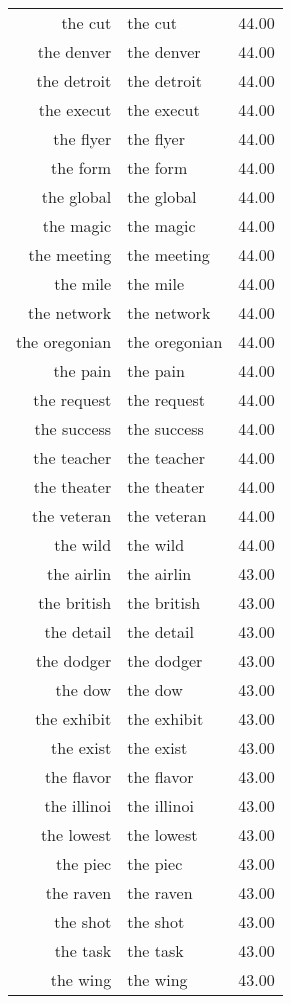 \begin{table}[ht]
\begin{tabular}{rlr}
  the cut & the cut & 44.00 \\ 
  the denver & the denver & 44.00 \\ 
  the detroit & the detroit & 44.00 \\ 
  the execut & the execut & 44.00 \\ 
  the flyer & the flyer & 44.00 \\ 
  the form & the form & 44.00 \\ 
  the global & the global & 44.00 \\ 
  the magic & the magic & 44.00 \\ 
  the meeting & the meeting & 44.00 \\ 
  the mile & the mile & 44.00 \\ 
  the network & the network & 44.00 \\ 
  the oregonian & the oregonian & 44.00 \\ 
  the pain & the pain & 44.00 \\ 
  the request & the request & 44.00 \\ 
  the success & the success & 44.00 \\ 
  the teacher & the teacher & 44.00 \\ 
  the theater & the theater & 44.00 \\ 
  the veteran & the veteran & 44.00 \\ 
  the wild & the wild & 44.00 \\ 
  the airlin & the airlin & 43.00 \\ 
  the british & the british & 43.00 \\ 
  the detail & the detail & 43.00 \\ 
  the dodger & the dodger & 43.00 \\ 
  the dow & the dow & 43.00 \\ 
  the exhibit & the exhibit & 43.00 \\ 
  the exist & the exist & 43.00 \\ 
  the flavor & the flavor & 43.00 \\ 
  the illinoi & the illinoi & 43.00 \\ 
  the lowest & the lowest & 43.00 \\ 
  the piec & the piec & 43.00 \\ 
  the raven & the raven & 43.00 \\ 
  the shot & the shot & 43.00 \\ 
  the task & the task & 43.00 \\ 
  the wing & the wing & 43.00 \\ 

\end{tabular}
\end{table}
